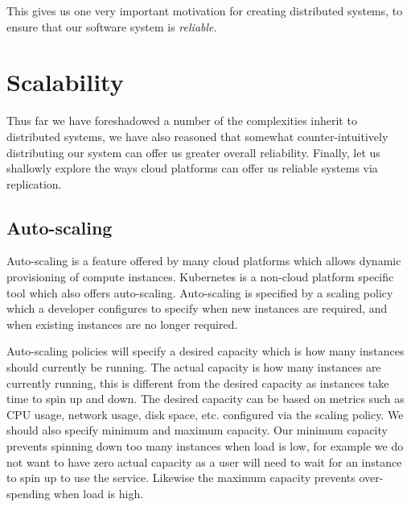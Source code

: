 This gives us one very important motivation for creating distributed systems,
to ensure that our software system is \textit{reliable}.




\section{Scalability}
Thus far we have foreshadowed a number of the complexities inherit to distributed systems,
we have also reasoned that somewhat counter-intuitively distributing our system can offer us greater overall reliability.
Finally, let us shallowly explore the ways cloud platforms can offer us reliable systems via replication.

\subsection{Auto-scaling}
Auto-scaling is a feature offered by many cloud platforms which allows dynamic provisioning of compute instances.
Kubernetes is a non-cloud platform specific tool which also offers auto-scaling.
Auto-scaling is specified by a scaling policy which a developer configures to specify when new instances are required, and when existing instances are no longer required.

Auto-scaling policies will specify a desired capacity which is how many instances should currently be running.
The actual capacity is how many instances are currently running,
this is different from the desired capacity as instances take time to spin up and down.
The desired capacity can be based on metrics such as CPU usage, network usage, disk space, etc. configured via the scaling policy.
We should also specify minimum and maximum capacity.
Our minimum capacity prevents spinning down too many instances when load is low, 
for example we do not want to have zero actual capacity as a user will need to wait for an instance to spin up to use the service.
Likewise the maximum capacity prevents over-spending when load is high.

